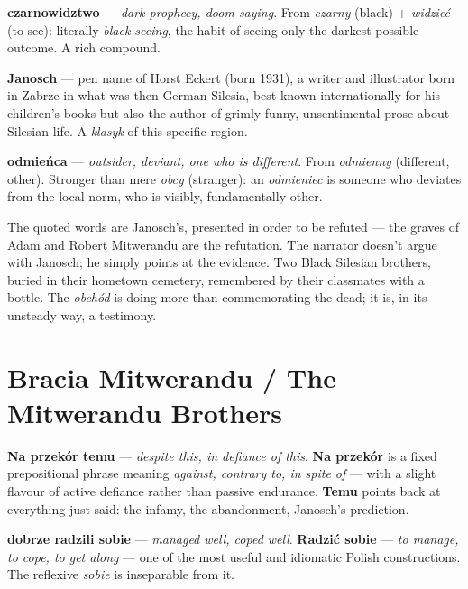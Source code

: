 \textbf{czarnowidztwo} --- \textit{dark prophecy, doom-saying}. From
\textit{czarny} (black) + \textit{widzieć} (to see): literally
\textit{black-seeing}, the habit of seeing only the darkest possible
outcome. A rich compound.

\textbf{Janosch} --- pen name of Horst Eckert (born 1931), a writer
and illustrator born in Zabrze in what was then German Silesia, best
known internationally for his children's books but also the author of
grimly funny, unsentimental prose about Silesian life. A
\textit{klasyk} of this specific region.

\textbf{odmieńca} --- \textit{outsider, deviant, one who is different}.
From \textit{odmienny} (different, other). Stronger than mere
\textit{obcy} (stranger): an \textit{odmieniec} is someone who
deviates from the local norm, who is visibly, fundamentally other.

The quoted words are Janosch's, presented in order to be refuted ---
the graves of Adam and Robert Mitwerandu are the refutation. The
narrator doesn't argue with Janosch; he simply points at the evidence.
Two Black Silesian brothers, buried in their hometown cemetery,
remembered by their classmates with a bottle. The \textit{obchód} is
doing more than commemorating the dead; it is, in its unsteady way,
a testimony.

\section{Bracia Mitwerandu / The Mitwerandu Brothers}


\textbf{Na przekór temu} --- \textit{despite this, in defiance of this}.
\textbf{Na przekór} is a fixed prepositional phrase meaning \textit{against,
contrary to, in spite of} --- with a slight flavour of active defiance
rather than passive endurance. \textbf{Temu} points back at everything
just said: the infamy, the abandonment, Janosch's prediction.

\textbf{dobrze radzili sobie} --- \textit{managed well, coped well}.
\textbf{Radzić sobie} --- \textit{to manage, to cope, to get along}
--- one of the most useful and idiomatic Polish constructions. The
reflexive \textit{sobie} is inseparable from it.

